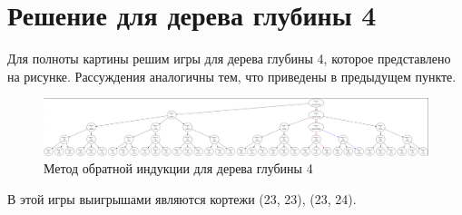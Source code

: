 \section{Решение для дерева глубины 4}

Для полноты картины решим игры для дерева глубины 4, которое представлено на рисунке.
Рассуждения аналогичны тем, что приведены в предыдущем пункте.

\begin{figure}
  \centering
  \includegraphics[scale=0.2]{../../artifacts/lw4/5.png}
  \caption{Метод обратной индукции для дерева глубины 4}
  \label{fig:fig05}
\end{figure}

В этой игры выигрышами являются кортежи (23, 23), (23, 24).
